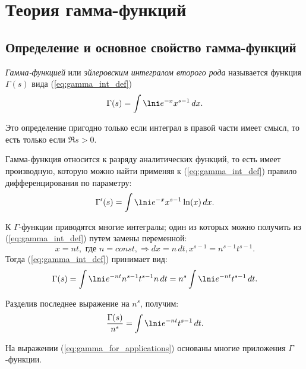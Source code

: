 \section{Теория гамма-функций}

\subsection{Определение и основное свойство гамма-функций}

\emph{Гамма-функцией} или \emph{эйлеровским интегралом второго рода} называется
функция \( \Gamma(s) \) вида (\ref{eq:gamma_int_def})
\begin{equation}
    \Gamma(s) = \int\lni e^{-x}x^{s-1}\,dx.
    \label{eq:gamma_int_def}
\end{equation}

Это определение пригодно только если интеграл в правой части имеет смысл, то
есть только если \( \Re s > 0 \).

Гамма-функция относится к разряду аналитических функций, то есть имеет
производную, которую можно найти применяя к (\ref{eq:gamma_int_def}) правило
дифференцирования по параметру:
\begin{equation}
    \Gamma'(s) = \int\lni e^{-x}x^{s-1}\ln(x)\,dx.
    \label{eq:gamma_derivation}
\end{equation}

К \( \Gamma \)-функции приводятся многие интегралы; один из которых можно
получить из (\ref{eq:gamma_int_def}) путем замены переменной:
\[ 
    x = nt,\text{ где } n = const, \Rightarrow dx = n\,dt,
    x^{s-1} = n^{s-1}t^{s-1}.
\]
Тогда (\ref{eq:gamma_int_def}) принимает вид:
\[
    \Gamma(s) = \int\lni e^{-nt}n^{s-1}t^{s-1}n\,dt =
    n^s\int\lni e^{-nt}t^{s-1}\,dt.
\]

Разделив последнее выражение на \( n^s \), получим:
\begin{equation}
    \frac{\Gamma(s)}{n^s} = \int\lni e^{-nt}t^{s-1}\,dt.
    \label{eq:gamma_for_applications}
\end{equation}
 
На выражении (\ref{eq:gamma_for_applications}) основаны многие приложения
\( \Gamma \)-функции.

